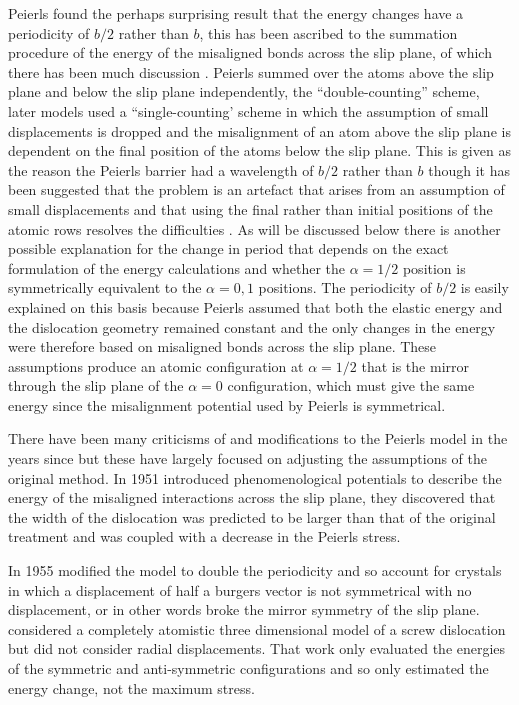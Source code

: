 Peierls found the perhaps surprising result that the energy changes have a periodicity of $b/2$ rather than $b$, this has been ascribed to the summation procedure of the energy of the misaligned bonds across the slip plane, of which there has been much discussion \cite{Hirth_Lothe1982lattice_periodicity,Lu2000peierls}. Peierls summed over the atoms above the slip plane and below the slip plane independently, the ``double-counting'' scheme, later models used a ``single-counting' scheme in which the assumption of small displacements is dropped and the misalignment of an atom above the slip plane is dependent on the final position of the atoms below the slip plane. This is given as the reason the Peierls barrier had a wavelength of $b/2$ rather than $b$ \cite{Hirth_Lothe1982lattice_periodicity,Lu2000peierls} though it has been suggested that the problem is an artefact that arises from an assumption of small displacements and that using the final rather than initial positions of the atomic rows resolves the difficulties \cite{Huntington1955}. As will be discussed below there is another possible explanation for the change in period that depends on the exact formulation of the energy calculations and whether the $\alpha=1/2$ position is symmetrically equivalent to the $\alpha = 0, 1$ positions. The periodicity of $b/2$ is easily explained on this basis because Peierls assumed that both the elastic energy and the dislocation geometry remained constant and the only changes in the energy were therefore based on misaligned bonds across the slip plane. These assumptions produce an atomic configuration at $\alpha=1/2$ that is the mirror through the slip plane of the $\alpha=0$ configuration, which must give the same energy since the misalignment potential used by Peierls is symmetrical.




There have been many criticisms of and modifications to the Peierls model in the years since but these have largely focused on adjusting the assumptions of the original method.
In 1951 \citet{Foreman1951} introduced phenomenological potentials to describe the energy of the misaligned interactions across the slip plane, they discovered that the width of the dislocation was predicted to be larger than that of the original treatment and was coupled with a decrease in the Peierls stress.

In 1955 \citet{Huntington1955} modified the model to double the periodicity and so account for crystals in which a displacement of half a burgers vector is not symmetrical with no displacement, or in other words broke the mirror symmetry of the slip plane. 
\citet{Maradudin1959} considered a completely atomistic three dimensional model of a screw dislocation but did not consider radial displacements. That work only evaluated the energies of the symmetric and anti-symmetric configurations and so only estimated the energy change, not the maximum stress.



